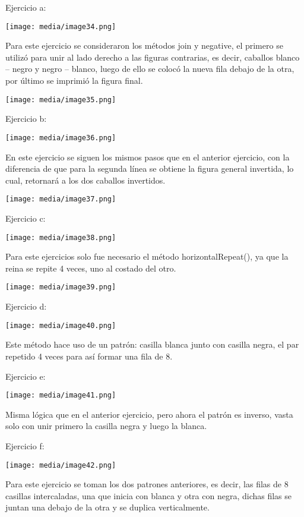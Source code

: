 \documentclass[
]{article}
\begin{document}
Ejercicio a:

\texttt{[image: media/image34.png]}

Para este ejercicio se consideraron los métodos join y negative, el
primero se utilizó para unir al lado derecho a las figuras contrarias,
es decir, caballos blanco -- negro y negro -- blanco, luego de ello se
colocó la nueva fila debajo de la otra, por último se imprimió la figura
final.

\texttt{[image: media/image35.png]}

Ejercicio b:

\texttt{[image: media/image36.png]}

En este ejercicio se siguen los mismos pasos que en el anterior
ejercicio, con la diferencia de que para la segunda línea se obtiene la
figura general invertida, lo cual, retornará a los dos caballos
invertidos.

\texttt{[image: media/image37.png]}

Ejercicio c:

\texttt{[image: media/image38.png]}

Para este ejercicios solo fue necesario el método horizontalRepeat(), ya
que la reina se repite 4 veces, uno al costado del otro.

\texttt{[image: media/image39.png]}

Ejercicio d:

\texttt{[image: media/image40.png]}

Este método hace uso de un patrón: casilla blanca junto con casilla
negra, el par repetido 4 veces para así formar una fila de 8.

Ejercicio e:

\texttt{[image: media/image41.png]}

Misma lógica que en el anterior ejercicio, pero ahora el patrón es
inverso, vasta solo con unir primero la casilla negra y luego la blanca.

Ejercicio f:

\texttt{[image: media/image42.png]}

Para este ejercicio se toman los dos patrones anteriores, es decir, las
filas de 8 casillas intercaladas, una que inicia con blanca y otra con
negra, dichas filas se juntan una debajo de la otra y se duplica
verticalmente.
\end{document}
